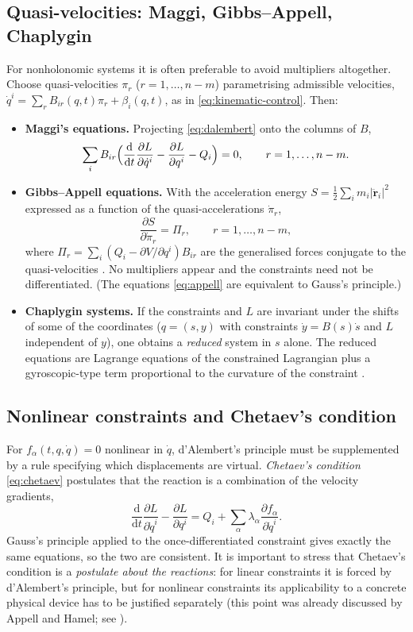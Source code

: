 \documentclass[11pt,a4paper]{article}
\theoremstyle{definition}
\theoremstyle{plain}
\theoremstyle{remark}
\newcommand{\ddt}{\frac{\mathrm{d}}{\mathrm{d}t}}
\newcommand{\pd}[2]{\frac{\partial #1}{\partial #2}}
\begin{document}
\subsection{Quasi-velocities: Maggi, Gibbs--Appell, Chaplygin}
For nonholonomic systems it is often preferable to avoid multipliers altogether. Choose
quasi-velocities $\pi_r$ ($r=1,\dots,n-m$) parametrising admissible velocities,
$\dot q^i=\sum_rB_{ir}(q,t)\pi_r+\beta_i(q,t)$, as in \eqref{eq:kinematic-control}.
Then:
\begin{itemize}[leftmargin=1.2em]
\item \textbf{Maggi's equations.} Projecting \eqref{eq:dalembert} onto the columns of $B$,
\[
  \sum_iB_{ir}\Bigl(\ddt\pd L{\dot q^i}-\pd L{q^i}-Q_i\Bigr)=0,\qquad r=1,\dots,n-m.
\]
\item \textbf{Gibbs--Appell equations.} With the acceleration energy
$S=\tfrac12\sum_im_i|\ddot{\mathbf r}_i|^2$ expressed as a function of the quasi-accelerations
$\dot\pi_r$,
\begin{equation}\label{eq:appell}
  \pd S{\dot\pi_r}=\Pi_r,\qquad r=1,\dots,n-m,
\end{equation}
where $\Pi_r=\sum_i(Q_i-\partial V/\partial q^i)B_{ir}$ are the generalised forces conjugate to
the quasi-velocities \cite{Gibbs1879,Pars1965}. No multipliers appear and the constraints
need not be differentiated. (The equations \eqref{eq:appell} are equivalent to Gauss's principle.)
\item \textbf{Chaplygin systems.} If the constraints and $L$ are invariant under the
shifts of some of the coordinates ($q=(s,y)$ with constraints $\dot y=B(s)\dot s$ and $L$
independent of $y$), one obtains a \emph{reduced} system in $s$ alone. The reduced
equations are Lagrange equations of the constrained Lagrangian plus a gyroscopic-type term
proportional to the curvature of the constraint \cite{Bloch1996,Bloch2003}.
\end{itemize}

\subsection{Nonlinear constraints and Chetaev's condition}\label{sec:chetaev}
For $f_\alpha(t,q,\dot q)=0$ nonlinear in $\dot q$, d'Alembert's principle must be supplemented
by a rule specifying which displacements are virtual. \emph{Chetaev's condition}
\eqref{eq:chetaev} postulates that the reaction is a combination of the velocity gradients,
\begin{equation}\label{eq:chetaev-eom}
  \ddt\pd L{\dot q^i}-\pd L{q^i}=Q_i+\sum_\alpha\lambda_\alpha\pd{f_\alpha}{\dot q^i}.
\end{equation}
Gauss's principle applied to the once-differentiated constraint gives exactly the same
equations, so the two are consistent. It is important to stress that Chetaev's condition is a
\emph{postulate about the reactions}: for linear constraints it is forced by d'Alembert's
principle, but for nonlinear constraints its applicability to a concrete physical device has
to be justified separately (this point was already discussed by Appell and
Hamel; see \cite{NeimarkFufaev1972}).
\end{document}
